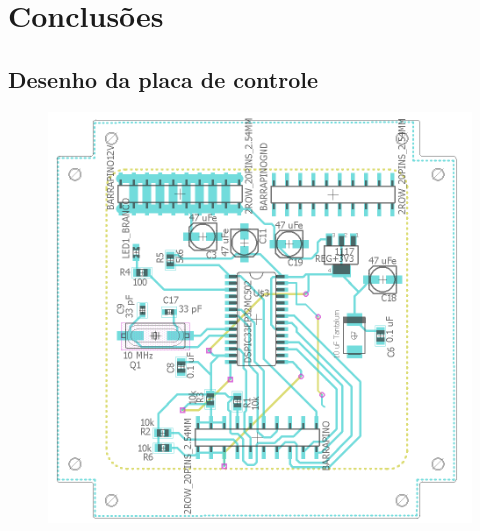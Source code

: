 \documentclass[
	12pt,				%
	openany,			%
	twoside,			%
	a4paper,			%
	english,			%
	french,				%
	spanish,			%
	brazil,				%
	oldfontcommands
	]{abntex2}
\begin{document}
\chapter[Conclusões]{Conclusões}



\begin{apendicesenv}
\partapendices

\chapter{Desenho da placa de controle}

\begin{figure}[th]
	\centering
	\includegraphics[width=1\linewidth]{./figs/Placa_master}
\end{figure}

\label{ap:PMaster}


\end{apendicesenv}
\end{document}
